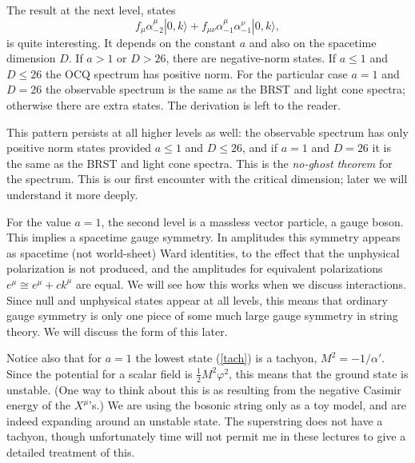 The result at the next level, states
\begin{equation}
f_\mu \alpha^\mu_{-2} |0,k\rangle + f_{\mu\nu} \alpha^\mu_{-1}
 \alpha^\nu_{-1} |0,k\rangle,
\end{equation}
is quite interesting.  It
depends on the constant
$a$ and also on the spacetime dimension $D$.  If $a > 1$ or $D >
26$, there are negative-norm states. If  $a \leq 1$ and $D \leq
26$ the OCQ spectrum has positive norm.  For the particular case
$a = 1$ and $D = 26$ the observable spectrum is the same as the
BRST and light cone spectra;
otherwise there are extra states.  The derivation is left to the
reader.

This pattern persists at all higher levels as well: the
observable spectrum has only positive norm states provided
$a \leq 1$ and $D \leq 26$, and if $a = 1$ and $D = 26$ it is
the same as the BRST and light cone spectra.  
This is the {\it no-ghost theorem} for the spectrum.  This is our
first encounter with the critical dimension; later we will
understand it more deeply.

For the value $a=1$, the second level is a
massless vector particle, a gauge boson.  This implies a
spacetime gauge symmetry.  In amplitudes this symmetry appears as
spacetime (not world-sheet) Ward identities, to the effect that
the unphysical polarization is not produced, and the amplitudes
for equivalent polarizations $e^\mu \cong e^\mu + c k^\mu$ are
equal.  We will see how this works when we discuss interactions.
Since null and unphysical states appear at all levels, this
means that ordinary gauge symmetry is only one piece of
some much large gauge symmetry in string theory.  We will
discuss the form of this later.

Notice also that for $a=1$ the lowest state (\ref{tach}) is a
tachyon, $M^2 = -1/\alpha'$.  Since the potential for a scalar
field is $\frac{1}{2} M^2 \varphi^2$, this means that the ground
state is unstable.  (One way to think about this is as resulting from
the negative Casimir energy of the $X^\mu$'s.)  We are using the
bosonic string only as a toy model, and are indeed expanding around an
unstable state.  The superstring does not have a tachyon, though
unfortunately time will not permit me in these lectures to give a
detailed treatment of this.

